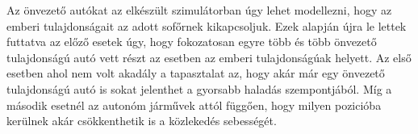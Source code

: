 Az önvezető autókat az elkészült szimulátorban úgy lehet modellezni, hogy az emberi tulajdonságait az adott sofőrnek kikapcsoljuk. Ezek alapján újra le lettek futtatva az előző esetek úgy, hogy fokozatosan egyre több és több önvezető tulajdonságú autó vett részt az esetben az emberi tulajdonságúak helyett. Az első esetben ahol nem volt akadály a tapasztalat az, hogy akár már egy önvezető tulajdonságú autó is sokat jelenthet a gyorsabb haladás szempontjából. Míg a második esetnél az autonóm járművek attól függően, hogy milyen pozicióba kerülnek akár csökkenthetik is a közlekedés sebességét.